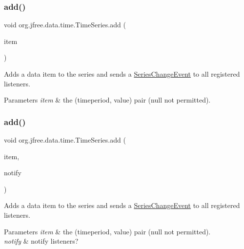\subsubsection{\texorpdfstring{add()}{add()}\hspace{0.1cm}{\footnotesize\ttfamily [1/6]}}
{\footnotesize\ttfamily void org.\+jfree.\+data.\+time.\+Time\+Series.\+add (\begin{DoxyParamCaption}\item[{\mbox{\hyperlink{classorg_1_1jfree_1_1data_1_1time_1_1_time_series_data_item}{Time\+Series\+Data\+Item}}}]{item }\end{DoxyParamCaption})}

Adds a data item to the series and sends a \mbox{\hyperlink{}{Series\+Change\+Event}} to all registered listeners.


\begin{DoxyParams}{Parameters}
{\em item} & the (timeperiod, value) pair ({\ttfamily null} not permitted). \\
\hline
\end{DoxyParams}
\mbox{\label{classorg_1_1jfree_1_1data_1_1time_1_1_time_series_acd1766ebcf16f5f76384b17406ee0766}} 
\subsubsection{\texorpdfstring{add()}{add()}\hspace{0.1cm}{\footnotesize\ttfamily [2/6]}}
{\footnotesize\ttfamily void org.\+jfree.\+data.\+time.\+Time\+Series.\+add (\begin{DoxyParamCaption}\item[{\mbox{\hyperlink{classorg_1_1jfree_1_1data_1_1time_1_1_time_series_data_item}{Time\+Series\+Data\+Item}}}]{item,  }\item[{boolean}]{notify }\end{DoxyParamCaption})}

Adds a data item to the series and sends a \mbox{\hyperlink{}{Series\+Change\+Event}} to all registered listeners.


\begin{DoxyParams}{Parameters}
{\em item} & the (timeperiod, value) pair ({\ttfamily null} not permitted). \\
\hline
{\em notify} & notify listeners? \\
\hline
\end{DoxyParams}
\mbox{\label{classorg_1_1jfree_1_1data_1_1time_1_1_time_series_a95116fd1b2467c94b3928dda5f70c612}} 
